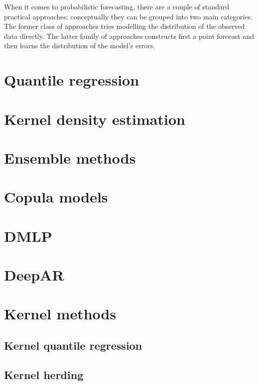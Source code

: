 When it comes to probabilistic forecasting, there are a couple of standard practical approaches; conceptually they can be grouped into two main categories. The former class of approaches tries modelling the distribution of the observed data directly. The latter family of approaches constructs first a point forecast and then learns the distribution of the model's errors.
\section{Quantile regression}


\section{Kernel density estimation}


\section{Ensemble methods}


\section{Copula models}

\section{DMLP}

\section{DeepAR}

\section{Kernel methods}
\subsection{Kernel quantile regression}
\subsection{Kernel herding}